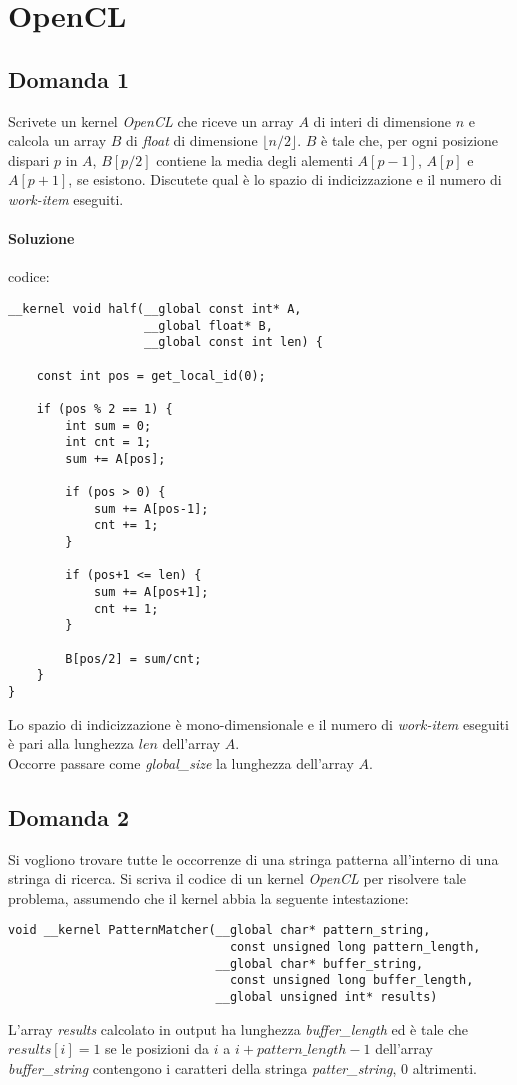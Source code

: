 \newpage

\section{OpenCL}

\subsection{Domanda 1}
Scrivete un kernel \textit{OpenCL} che riceve un array $A$ di interi di dimensione $n$ e calcola un array $B$ di \textit{float} di dimensione $\lfloor n/2 \rfloor$. $B$ è tale che, per ogni posizione dispari $p$ in $A$, $B[p/2]$ contiene la media degli alementi $A[p-1]$, $A[p]$ e $A[p+1]$, se esistono. Discutete qual è lo spazio di indicizzazione e il numero di \textit{work-item} eseguiti.

\paragraph{Soluzione}
codice:
\begin{lstlisting}
__kernel void half(__global const int* A,
                   __global float* B,
                   __global const int len) {

	const int pos = get_local_id(0);

	if (pos % 2 == 1) {
		int sum = 0;
		int cnt = 1;
		sum += A[pos];

		if (pos > 0) {
			sum += A[pos-1];
			cnt += 1;
		}

		if (pos+1 <= len) {
			sum += A[pos+1];
			cnt += 1;
		}

		B[pos/2] = sum/cnt;
	}
}
\end{lstlisting}
Lo spazio di indicizzazione è mono-dimensionale e il numero di \textit{work-item} eseguiti è pari alla lunghezza $len$ dell'array $A$. \\
Occorre passare come \textit{global\_size} la lunghezza dell'array $A$.

\newpage

\subsection{Domanda 2}
Si vogliono trovare tutte le occorrenze di una stringa patterna all'interno di una stringa di ricerca. Si scriva il codice di un kernel \textit{OpenCL} per risolvere tale problema, assumendo che il kernel abbia la seguente intestazione:
\begin{lstlisting}
void __kernel PatternMatcher(__global char* pattern_string,
                               const unsigned long pattern_length,
                             __global char* buffer_string,
                               const unsigned long buffer_length,
                             __global unsigned int* results)
\end{lstlisting}
L'array \textit{results} calcolato in output ha lunghezza \textit{buffer\_length} ed è tale che $results[i] = 1$ se le posizioni da $i$ a $i + pattern\_length - 1$ dell'array \textit{buffer\_string} contengono i caratteri della stringa \textit{patter\_string}, 0 altrimenti.
